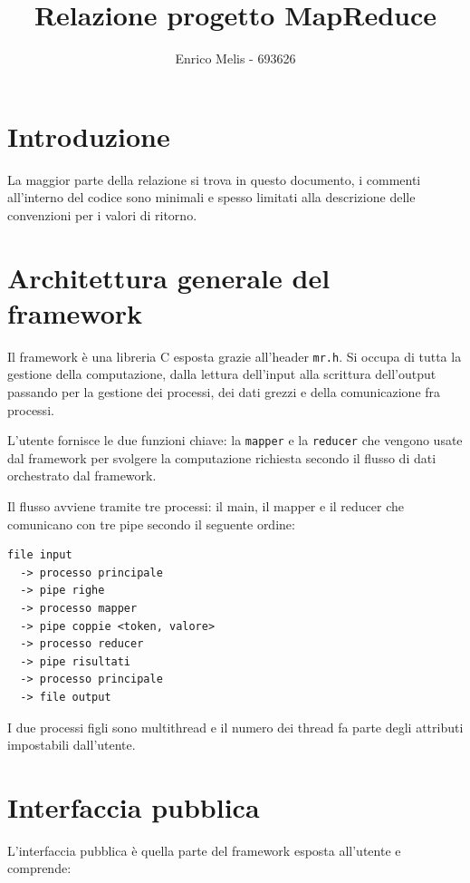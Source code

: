 \documentclass[11pt,a4paper]{article}
\title{Relazione progetto MapReduce}
\author{Enrico Melis - 693626}
\date{}
\begin{document}
\maketitle

\tableofcontents

\newpage
\section{Introduzione}

La maggior parte della relazione si trova in questo documento, i commenti all'interno del codice sono minimali e spesso limitati alla descrizione delle convenzioni per i valori di ritorno.

\section{Architettura generale del framework}

Il framework è una libreria C esposta grazie all'header \texttt{mr.h}. Si occupa di tutta la gestione della computazione, dalla lettura dell'input alla scrittura dell'output passando per la gestione dei processi, dei dati grezzi e della comunicazione fra processi.

L'utente fornisce le due funzioni chiave: la \texttt{mapper} e la \texttt{reducer} che vengono usate dal framework per svolgere la computazione richiesta secondo il flusso di dati orchestrato dal framework.

Il flusso avviene tramite tre processi: il main, il mapper e il reducer che comunicano con tre pipe secondo il seguente ordine:

\begin{verbatim}
file input
  -> processo principale
  -> pipe righe
  -> processo mapper
  -> pipe coppie <token, valore>
  -> processo reducer
  -> pipe risultati
  -> processo principale
  -> file output
\end{verbatim}

I due processi figli sono multithread e il numero dei thread fa parte degli attributi impostabili dall'utente.

\section{Interfaccia pubblica}

L'interfaccia pubblica è quella parte del framework esposta all'utente e comprende:
\end{document}
